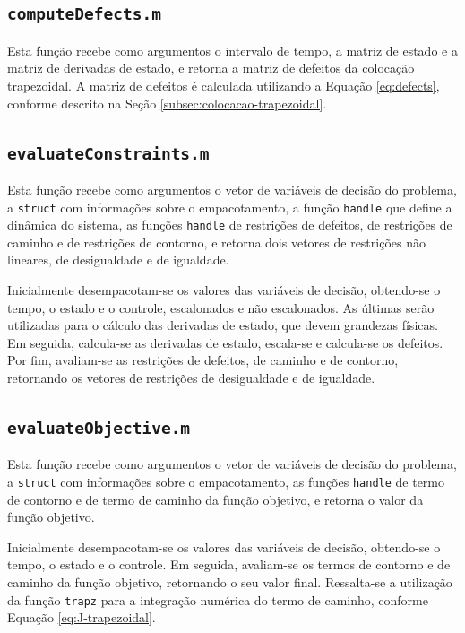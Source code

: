 \subsection{\texttt{computeDefects.m}}
\label{subsec:computedefects}

Esta função recebe como argumentos o intervalo de tempo, a matriz de estado e a matriz de derivadas de estado, e retorna a matriz de defeitos da colocação trapezoidal. A matriz de defeitos é calculada utilizando a Equação \ref{eq:defects}, conforme descrito na Seção \ref{subsec:colocacao-trapezoidal}.

\subsection{\texttt{evaluateConstraints.m}}
\label{subsec:evaluateconstraints}

Esta função recebe como argumentos o vetor de variáveis de decisão do problema, a \texttt{struct} com informações sobre o empacotamento, a função \texttt{handle} que define a dinâmica do sistema, as funções \texttt{handle} de restrições de defeitos, de restrições de caminho e de restrições de contorno, e retorna dois vetores de restrições não lineares, de desigualdade e de igualdade.

Inicialmente desempacotam-se os valores das variáveis de decisão, obtendo-se o tempo, o estado e o controle, escalonados e não escalonados. As últimas serão utilizadas para o cálculo das derivadas de estado, que devem grandezas físicas. Em seguida, calcula-se as derivadas de estado, escala-se e calcula-se os defeitos. Por fim, avaliam-se as restrições de defeitos, de caminho e de contorno, retornando os vetores de restrições de desigualdade e de igualdade.

\subsection{\texttt{evaluateObjective.m}}
\label{subsec:evaluateobjective}

Esta função recebe como argumentos o vetor de variáveis de decisão do problema, a \texttt{struct} com informações sobre o empacotamento, as funções \texttt{handle} de termo de contorno e de termo de caminho da função objetivo, e retorna o valor da função objetivo.

Inicialmente desempacotam-se os valores das variáveis de decisão, obtendo-se o tempo, o estado e o controle. Em seguida, avaliam-se os termos de contorno e de caminho da função objetivo, retornando o seu valor final. Ressalta-se a utilização da função \texttt{trapz} para a integração numérica do termo de caminho, conforme Equação \ref{eq:J-trapezoidal}.

